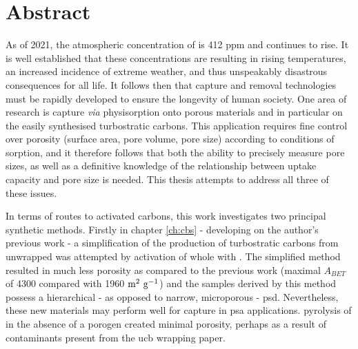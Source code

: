 \cleardoublepage

\chapter*{Abstract} \label{Abstract}

As of 2021, the atmospheric concentration of  is 412 ppm and continues to rise. It is well established that these concentrations are resulting in rising temperatures, an increased incidence of extreme weather, and thus unspeakably disastrous consequences for all life. It follows then that  capture and removal technologies must be rapidly developed to ensure the longevity of human society. One area of research is  capture \textit{via} \gls{physisorption} onto porous materials and in particular on the easily synthesised \glspl{turbostratic carbon}. This application requires fine control over porosity (surface area, pore volume, pore size) according to conditions of sorption, and it therefore follows that both the ability to precisely measure pore sizes, as well as a definitive knowledge of the relationship between  uptake capacity and pore size is needed. This thesis attempts to address all three of these issues.

In terms of routes to \glspl{activated carbon}, this work investigates two principal synthetic methods. Firstly in chapter \ref{ch:cbs} - developing on the author's previous work - a simplification of the production of \glspl{turbostratic carbon} from unwrapped  was attempted by \gls{activation} of whole  with . The simplified method resulted in much less porosity as compared to the previous work (maximal $A_{BET}$ of 4300 compared with 1960 $\rm m^2\ g^{-1}$) and the samples derived by this method possess a hierarchical - as opposed to narrow, microporous - \acrfull{psd}. Nevertheless, these new materials may perform well for  capture in \acrfull{psa} applications. \Gls{pyrolysis} of  in the absence of a \gls{porogen} created minimal porosity, perhaps as a result of contaminants present from the \acrshort{ucb} wrapping paper. 

